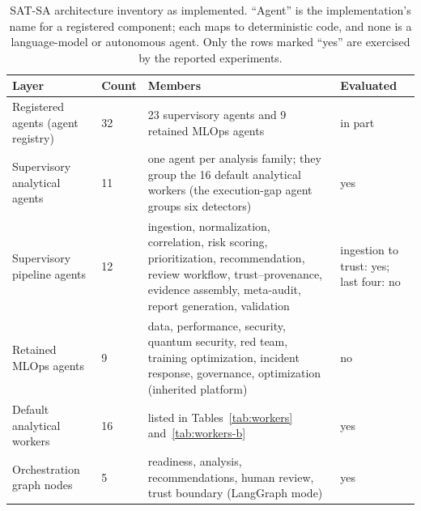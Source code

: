 \begin{table}[!htbp]
\caption{SAT-SA architecture inventory as implemented. ``Agent'' is the
implementation's name for a registered component; each maps to deterministic code, and
none is a language-model or autonomous agent. Only the rows marked ``yes'' are exercised
by the reported experiments.}
\label{tab:architecture}
\centering
\small
\setlength{\tabcolsep}{3pt}
\begin{tabular}{@{}L{3.5cm}L{1.0cm}L{5.1cm}L{1.8cm}@{}}
\toprule
Layer & Count & Members & Evaluated \\
\midrule
Registered agents (agent registry) & 32 & 23 supervisory agents and 9 retained MLOps agents & in part \\
\quad Supervisory analytical agents & 11 & one agent per analysis family; they group the 16 default analytical workers (the execution-gap agent groups six detectors) & yes \\
\quad Supervisory pipeline agents & 12 & ingestion, normalization, correlation, risk scoring, prioritization, recommendation, review workflow, trust--provenance, evidence assembly, meta-audit, report generation, validation & ingestion to trust: yes; last four: no \\
\quad Retained MLOps agents & 9 & data, performance, security, quantum security, red team, training optimization, incident response, governance, optimization (inherited platform) & no \\
Default analytical workers & 16 & listed in Tables~\ref{tab:workers} and~\ref{tab:workers-b} & yes \\
Orchestration graph nodes & 5 & readiness, analysis, recommendations, human review, trust boundary (LangGraph mode) & yes \\
\bottomrule
\end{tabular}
\end{table}
